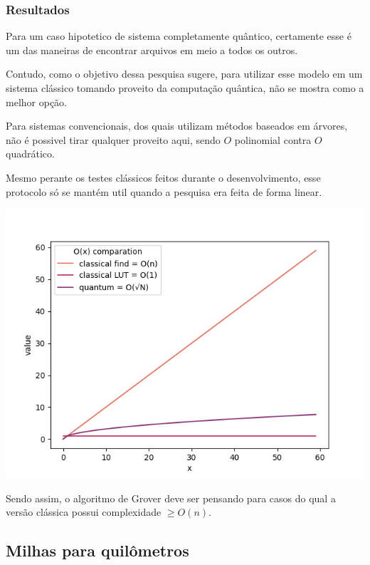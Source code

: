 \documentclass{article}
\begin{document}
\subsubsection{Resultados}

Para um caso hipotetico de sistema completamente quântico, certamente esse é um das maneiras de encontrar arquivos em meio a todos os outros.

Contudo, como o objetivo dessa pesquisa sugere, para utilizar esse modelo em um sistema clássico tomando proveito da computação quântica, não se mostra como a melhor opção.

Para sistemas convencionais, dos quais utilizam métodos baseados em árvores, não é possivel tirar qualquer proveito aqui, sendo $O$ polinomial contra $O$ quadrático.

Mesmo perante os testes clássicos feitos durante o desenvolvimento, esse protocolo só se mantém util quando a pesquisa era feita de forma linear.


\begin{center}
	\includegraphics[scale=0.5]{algorithms-finding-comparation.png}
	\label{fig:file-explorer-comparation-O}
\end{center}

Sendo assim, o algoritmo de Grover deve ser pensando para casos do qual a versão clássica possui complexidade $\ge O(n)$.


\subsection{Milhas para quilômetros} \label{conversion}
\end{document}
